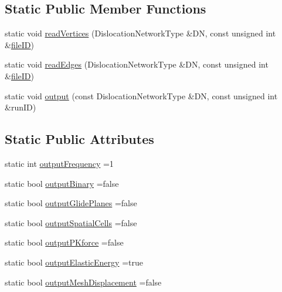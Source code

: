 \subsection*{Static Public Member Functions}
\begin{DoxyCompactItemize}
\item 
static void \hyperlink{structmodel_1_1_dislocation_network_i_o_adf5e2499f973ed4eba15a1cbe615f519}{read\+Vertices} (Dislocation\+Network\+Type \&D\+N, const unsigned int \&\hyperlink{plot_cells_8m_a0ec0c207d7a3e6e832e437db4c0cd9dc}{file\+I\+D})
\item 
static void \hyperlink{structmodel_1_1_dislocation_network_i_o_a370feb4ebca1d50307358c8ef2421c89}{read\+Edges} (Dislocation\+Network\+Type \&D\+N, const unsigned int \&\hyperlink{plot_cells_8m_a0ec0c207d7a3e6e832e437db4c0cd9dc}{file\+I\+D})
\item 
static void \hyperlink{structmodel_1_1_dislocation_network_i_o_a80ccf228a9930a3a75c8ad38f6c242db}{output} (const Dislocation\+Network\+Type \&D\+N, const unsigned int \&run\+I\+D)
\end{DoxyCompactItemize}
\subsection*{Static Public Attributes}
\begin{DoxyCompactItemize}
\item 
static int \hyperlink{structmodel_1_1_dislocation_network_i_o_a332e7031dfa21ac57b3d9816bb895007}{output\+Frequency} =1
\item 
static bool \hyperlink{structmodel_1_1_dislocation_network_i_o_a835ea647153ba2dc77cfefea5cc864f8}{output\+Binary} =false
\item 
static bool \hyperlink{structmodel_1_1_dislocation_network_i_o_aeb79ef10bfde6bbb003b848cac1c305c}{output\+Glide\+Planes} =false
\item 
static bool \hyperlink{structmodel_1_1_dislocation_network_i_o_ae73e971a9665d4cd5d0e4765ab6eeeb2}{output\+Spatial\+Cells} =false
\item 
static bool \hyperlink{structmodel_1_1_dislocation_network_i_o_a918487adc6dd968a538aaf640e43dec3}{output\+P\+Kforce} =false
\item 
static bool \hyperlink{structmodel_1_1_dislocation_network_i_o_afa7d59390353ba504bc510f4bd932883}{output\+Elastic\+Energy} =true
\item 
static bool \hyperlink{structmodel_1_1_dislocation_network_i_o_affea60946cd055d674f5f35c799109ef}{output\+Mesh\+Displacement} =false
\end{DoxyCompactItemize}


